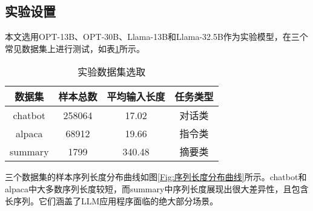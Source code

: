 
\subsection{实验设置}

本文选用OPT-13B、OPT-30B、Llama-13B和Llama-32.5B作为实验模型，在三个常见数据集上进行测试，如表\ref{Table:实验数据集选取}所示。

\begin{table}[H]
  \centering
  \caption{实验数据集选取}
  \label{Table:实验数据集选取}
  \renewcommand{\arraystretch}{1.2}
  \small
  \begin{tabular}{c c c c}
    \toprule
    \textbf{数据集} & \textbf{样本总数} & \textbf{平均输入长度} & \textbf{任务类型} \\
    \midrule
    chatbot & 258064 & 17.02 & 对话类 \\
    alpaca & 68912 & 19.66 & 指令类 \\
    summary & 1799 & 340.48 & 摘要类 \\
    \bottomrule
  \end{tabular}
\end{table}

三个数据集的样本序列长度分布曲线如图\ref{Fig:序列长度分布曲线}所示。chatbot和alpaca中大多数序列长度较短，而summary中序列长度展现出很大差异性，且包含长序列。它们涵盖了LLM应用程序面临的绝大部分场景。

